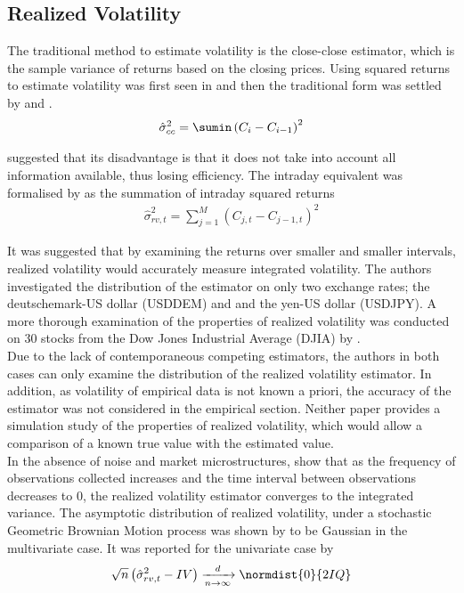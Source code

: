 \documentclass[12pt]{article}
\begin{document}
\subsection{Realized Volatility} 

The traditional method to estimate volatility is the close-close estimator, which is the sample variance of
returns based on the closing prices. Using squared returns to estimate volatility was first seen in
\citet{taylor1986modelling} and then the traditional form was settled by \citet{French1987} and
\citet{Schwert1989}.
\begin{align*}
  \hat{\sigma}_{cc}^2 = \sumin \left(C_i - C_{i-1} \right)^2
\end{align*}

\citet{Garman1980} suggested that its disadvantage is that it does not take into account all information
available, thus losing efficiency. The intraday equivalent was formalised by \citet{Andersen2001} as the
summation of intraday squared returns
\begin{align*}
  \hat{\sigma}_{rv,t}^2 = \sum_{j=1}^M \left(C_{j,t} - C_{j-1,t} \right)^2
\end{align*}

It was suggested that by examining the returns over smaller and smaller intervals, realized volatility would
accurately measure integrated volatility. The authors investigated the distribution of the estimator on only
two exchange rates; the deutschemark-US dollar (USDDEM) and and the yen-US dollar (USDJPY). A more thorough
examination of the properties of realized volatility was conducted on 30 stocks from the Dow Jones Industrial
Average (DJIA) by \citet{Andersen2001a}. \\

Due to the lack of contemporaneous competing estimators, the authors in both cases can only examine the
distribution of the realized volatility estimator. In addition, as volatility of empirical data is not known a
priori, the accuracy of the estimator was not considered in the empirical section. Neither paper provides a
simulation study of the properties of realized volatility, which would allow a comparison of a known true
value with the estimated value. \\

In the absence of noise and market microstructures, \citet{Andersen2003} show that as the frequency of
observations collected increases and the time interval between observations decreases to 0, the realized
volatility estimator converges to the integrated variance. The asymptotic distribution of realized volatility,
under a stochastic Geometric Brownian Motion process was shown by \citet{Bandi2008} to be Gaussian in the
multivariate case. It was reported for the univariate case by \citet{McAleer2008}
\begin{align*}
  \sqrt{n} \left( \hat{\sigma}_{rv,t}^2 - IV \right) \xrightarrow[n \to \infty]{d}
  \normdist{0}{2 IQ}
\end{align*}
\end{document}

